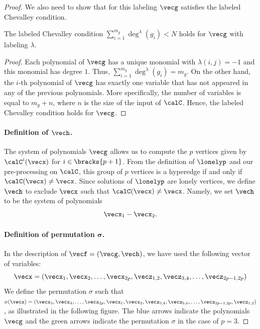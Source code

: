 \begin{proof}
        We also need to show that for this labeling $\vecg$ satisfies the labeled
        Chevalley condition.
        \begin{claim}
          \label{cl:ChevalleyForf1}
          The labeled Chevalley condition
          $\sum_{i = 1}^{m_g} \deg^{\lambda}(g_i) < N$ holds for $\vecg$ with
          labeling $\lambda$.
        \end{claim}
        \begin{proof}              Each polynomial of $\vecg$ has a unique monomial with $\lambda(i,j) = -1$
              and this monomial has degree $1$. Thus,
              $\sum_{i = 1}^{m_g} \deg^{\lambda}(g_{i}) = m_g$.
              On the other hand, the $i$-th polynomial of $\vecg$ has exactly one
              variable that has not appeared in any of the previous polynomials. More
              specifically, the number of variables is equal to $m_g + n$, where $n$
              is the size of the input of $\calC$. Hence, the labeled Chevalley
              condition holds for $\vecg$.
        \end{proof}

        \paragraph{Definition of $\vech$.} The system of polynomials $\vecg$ allows
        us to compute the $p$ vertices given by ${\calC}^{i}(\vecx)$ for
        $i \in \bracks{p+1}$. From the definition of $\lonelyp$ and our pre-processing on
        $\calC$, this group of $p$ vertices is a hyperedge if and only if
        $\calC(\vecx) \neq \vecx$. Since solutions of $\lonelyp$ are lonely
        vertices, we define $\vech$ to exclude $\vecx$ such that
        $\calC(\vecx) \neq \vecx$. Namely, we set $\vech$ to be the system of
        polynomials
                          \[ \vecx_1 - \vecx_2.\]

        \paragraph{Definition of permutation $\boldsymbol{\sigma}$.} In the description
        of $\vecf = (\vecg, \vech)$, we have used the following vector of variables:
                    \[  \vecx = (\vecx_1, \vecx_2, \dots, \vecx_{2p},
                          \vecz_{1,2}, \vecz_{3,4}, \dots, \vecz_{2p-1,2p} )
                    \]
      	We define the permutation $\sigma$ such that $\sigma(\vecx) = (\vecx_3, \vecx_4, \dots, \vecx_{2p},
                \vecx_1, \vecx_2, \vecz_{3,4}, \vecz_{5,6}, \dots, \vecz_{2p-1,2p},
                \vecz_{1,2})$, as illustrated in the following figure. The \textcolor{Gblue}{blue} arrows indicate the polynomials $\vecg$ and the \textcolor{Ggreen}{green} arrows indicate the permutation $\sigma$ in the case of $p=3$.


\end{proof}
